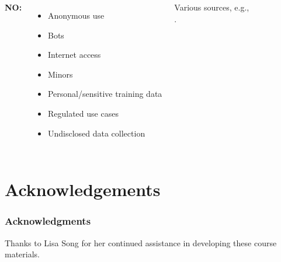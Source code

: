 \documentclass[11pt,
               aspectratio=169,
               hyperref={colorlinks}
               ]{beamer}
\begin{document}
\begin{frame}
\begin{columns}
					\textbf{NO:}
					\begin{itemize}\small
						\item Anonymous use
						\item Bots
						\item Internet access
						\item Minors
						\item Personal/sensitive training data
						\item Regulated use cases
						\item Undisclosed data collection
					\end{itemize}
					\vspace{5pt}
					\tiny{Various sources, e.g.,\\ \cite{weidinger2022taxonomy}.}
				
			\end{columns}
					
		\end{frame}


\section{Acknowledgements} 

\begin{frame}
	
	\frametitle{Acknowledgments}
	
	Thanks to Lisa Song for her continued assistance in developing these course materials.
	
\end{frame}	





			
\end{document}

